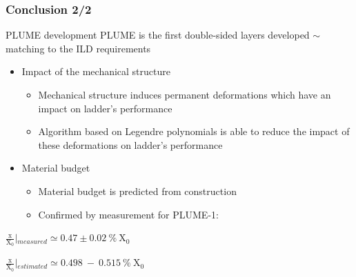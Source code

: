 \documentclass{beamer}
\begin{document}
\begin{frame}
  \frametitle{Conclusion 2/2}

    \begin{block}{PLUME development}
    PLUME is the first double-sided layers developed $\sim$ matching to the ILD requirements
    \begin{itemize}
      \item Impact of the mechanical structure
      \begin{itemize}
        \item Mechanical structure induces permanent deformations which have an impact on ladder's performance
        \item Algorithm based on Legendre polynomials is able to reduce the impact of these deformations on ladder's performance
      \end{itemize}
      \item Material budget
      \begin{itemize}
        \item Material budget is predicted from construction
        \item Confirmed by measurement for PLUME-1:
      \end{itemize}
    \end{itemize}
    \begin{center}
      $\frac{\text{x}}{\text{X}_0}\left|_{measured} \simeq 0.47 \pm 0.02~\%~\text{X}_0 \right.$

      $\frac{\text{x}}{\text{X}_0}\left|_{estimated} \simeq 0.498~-~0.515~\%~\text{X}_0 \right.$
     \end{center}
  \end{block}
\end{frame}
\end{document}
